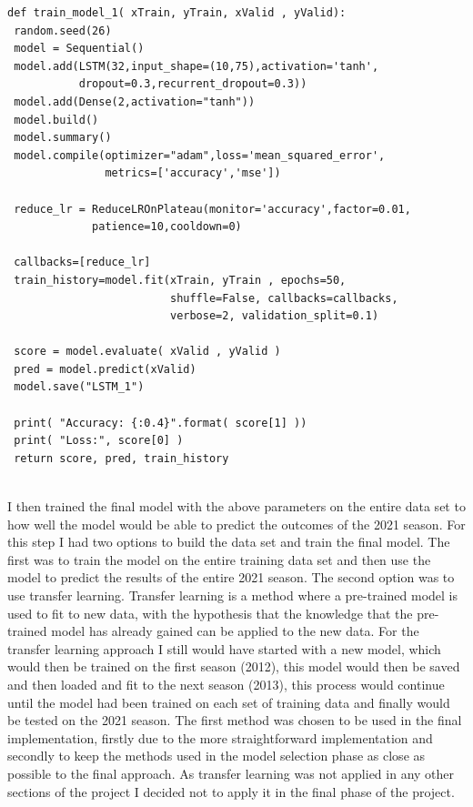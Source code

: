 \documentclass{imc-inf}
\begin{document}
\begin{lstlisting}
def train_model_1( xTrain, yTrain, xValid , yValid):
 random.seed(26)
 model = Sequential()
 model.add(LSTM(32,input_shape=(10,75),activation='tanh',
           dropout=0.3,recurrent_dropout=0.3))
 model.add(Dense(2,activation="tanh"))
 model.build()   
 model.summary()
 model.compile(optimizer="adam",loss='mean_squared_error',
               metrics=['accuracy','mse'])

 reduce_lr = ReduceLROnPlateau(monitor='accuracy',factor=0.01,
             patience=10,cooldown=0)

 callbacks=[reduce_lr]
 train_history=model.fit(xTrain, yTrain , epochs=50, 
                         shuffle=False, callbacks=callbacks,
                         verbose=2, validation_split=0.1)

 score = model.evaluate( xValid , yValid )
 pred = model.predict(xValid)
 model.save("LSTM_1")

 print( "Accuracy: {:0.4}".format( score[1] ))
 print( "Loss:", score[0] )
 return score, pred, train_history
	
\end{lstlisting}
	
	I then trained the final model with the above parameters on the entire data set to how well the model would be able to predict the outcomes of the 2021 season. For this step I had two options to build the data set and train the final model. The first was to train the model on the entire training data set and then use the model to predict the results of the entire 2021 season. The second option was to use transfer learning. Transfer learning is a method where a pre-trained model is used to fit to new data, with the hypothesis that the knowledge that the pre-trained model has already gained can be applied to the new data. For the transfer learning approach I still would have started with a new model, which would then be trained on the first season (2012), this model would then be saved and then loaded and fit to the next season (2013), this process would continue until the model had been trained on each set of training data and finally would be tested on the 2021 season.
	The first method was chosen to be used in the final implementation, firstly due to the more straightforward implementation and secondly to keep the methods used in the model selection phase as close as possible to the final approach. As transfer learning was not applied in any other sections of the project I decided not to apply it in the final phase of the project.
	
\end{document}
